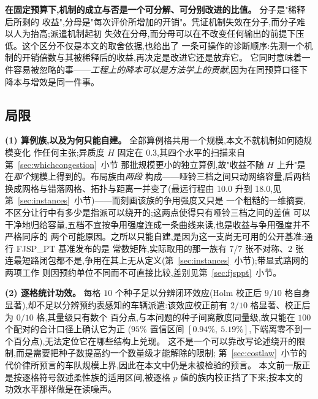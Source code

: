 \documentclass[manuscript,screen,review]{acmart}
\newcommand{\NCases}{10}
\newcommand{\NSeeds}{10}
\newcommand{\NPairs}{100}
\newcommand{\CIProbeLoop}{$[0.94\%,\ 5.19\%]$}
\newcommand{\CellsSigLoopAdj}{9}
\newcommand{\CellsSigProbe}{2}
\newcommand{\CellsSigProbeAdj}{0}
\newcommand{\LegDumbbell}{10.0}          %
\newcommand{\LegGrid}{18.0}              %
\newcommand{\PubNLayout}{7}
\newcommand{\PubNLayoutAsym}{7}           %
\newcommand{\PubNLayoutBad}{2}            %
\begin{document}
\textbf{在固定预算下,机制的成立与否是一个可分解、可分别改进的比值。} 分子是"稀释后所剩的
收益",分母是"每次评价所增加的开销"。凭证机制失效在分子,而分子难以人为抬高;派遣机制起初
失效在分母,而分母可以在不改变任何输出的前提下压低。这个区分不仅是本文的取舍依据,也给出了
一条可操作的诊断顺序:先测一个机制的开销倍数与其被稀释后的收益,再决定是改进它还是放弃它。
它同时意味着一件容易被忽略的事——\emph{工程上的降本可以是方法学上的贡献},因为在同预算口径下
降本与增效是同一件事。

\subsection{局限}
\label{sec:limitations}

\textbf{(1) 算例族,以及为何只能自建。} 全部算例格共用一个规模,本文不就机制如何随规模变化
作任何主张;异质度 $H$ 固定在 $0.3$,其四个水平的扫描来自第~\ref{sec:whichcongestion}~小节
那批规模更小的独立算例,故"收益不随 $H$ 上升"是在\emph{那个}规模上得到的。布局族由\emph{两段}
构成——哑铃三档之间只动网络容量,后两档换成网格与错落网格、拓扑与距离一并变了(最远行程由
\LegDumbbell{} 升到 \LegGrid{},见第~\ref{sec:instances}~小节)——而刻画该族的争用强度又只是
一个粗糙的一维摘要,不区分让行中有多少是指派可以绕开的;这两点使得只有哑铃三档之间的差值
可以干净地归给容量,五档不宜按争用强度连成一条曲线来读,也是收益与争用强度并不严格同序的
两个可能原因。之所以只能自建,是因为这一支尚无可用的公开基准:通行 FJSP\_PT 基准发布的是
常数矩阵,实际取用的那一族有 \PubNLayoutAsym{}/\PubNLayout{} 张不对称、\PubNLayoutBad{} 张
连最短路闭包都不是,争用在其上无从定义(第~\ref{sec:instances}~小节);带显式路网的两项工作
则因预约单位不同而不可直接比较,差别见第~\ref{sec:fjsppt}~小节。

\textbf{(2) 逐格统计功效。} 每格 $\NSeeds$ 个种子足以分辨闭环效应(Holm 校正后
$\CellsSigLoopAdj/\NCases$ 格自身显著),却不足以分辨预约表感知的车辆派遣:该效应校正前有
$\CellsSigProbe/\NCases$ 格显著、校正后为 $\CellsSigProbeAdj/\NCases$ 格,其量级只有数个
百分点,与本问题的种子间离散度同量级,故只能在 $\NPairs$ 个配对的合计口径上确认它为正
($95\%$ 置信区间 \CIProbeLoop{},下端离零不到一个百分点),无法定位它在哪些结构上兑现。
这不是一个可以靠改写论述绕开的限制,而是需要把种子数提高约一个数量级才能解除的限制;
第~\ref{sec:costlaw}~小节的代价律所预言的车队规模上界,因此在本文中仍是未被检验的预言。
本文前一版正是按逐格符号叙述柔性族的适用区间,被逐格 $p$ 值的族内校正挡了下来;按本文的
功效水平那样做是在读噪声。
\end{document}
